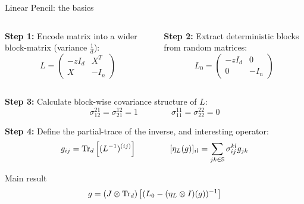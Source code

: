 \documentclass[10pt]{beamer}
\begin{document}
\begin{frame}{Linear Pencil: the basics}
  \begin{columns}[T]
    \begin{column}{0.45\textwidth}
  \textbf{Step 1:} Encode matrix into a wider block-matrix (variance $\frac{1}{d}$):
  \begin{equation*}
    L = \begin{pmatrix}
      -z I_d & X^T\\
      X & - I_n
    \end{pmatrix}
  \end{equation*}
\end{column}
\begin{column}{0.45\textwidth}

  \textbf{Step 2:} Extract deterministic blocks from random matrices:
  \begin{equation*}
    L_0 = \begin{pmatrix}
      -z I_d& 0\\
      0 & -I_n
    \end{pmatrix}
  \end{equation*}
  \end{column}
  \end{columns}
    
  \textbf{Step 3:} Calculate block-wise covariance structure of $L$:
  $$
  \sigma_{12}^{21} = \sigma_{21}^{12} = 1 
  \qquad
  \qquad
  \sigma_{11}^{11} = \sigma_{22}^{22} = 0
  $$


  \textbf{Step 4:} Define the partial-trace of the inverse, and interesting operator:
  \begin{equation*}
    g_{ij} = \traceLim[d]{
      (L^{-1})^{(ij)}
    }
    \qquad \qquad
    [\eta_L(g)]_{il} = \sum_{jk \in \mathbb S} \sigma_{ij}^{kl} g_{jk}
  \end{equation*}

  \begin{block}{Main result \cite{spectra,mingo2017free}}
    \begin{equation}\label{eq:main-result-linear-pencil}
        g = \traceLimOp[d]{
            (L_0 - (\eta_L \otimes I)(g))^{-1}
        }
    \end{equation}
  \end{block}
\end{frame}
\end{document}
